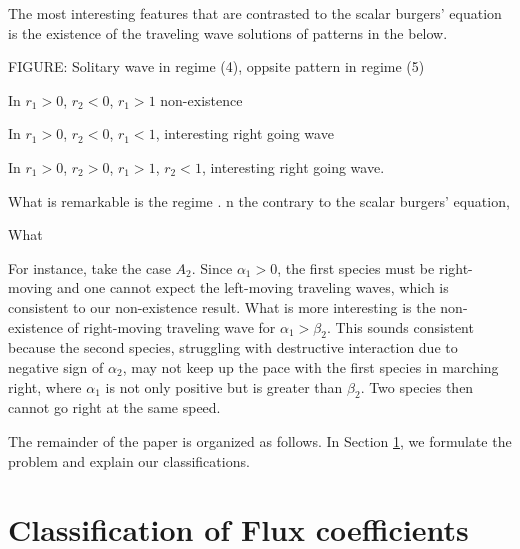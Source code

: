 \documentclass{amsart}
\def\blue{\color{blue}}
\theoremstyle{definition}
\numberwithin{equation}{section}
\begin{document}
{\blue
The most interesting features that are contrasted to the scalar burgers' equation is the existence of the traveling wave solutions of patterns in the below.

FIGURE: Solitary wave in regime (4), oppsite pattern in regime (5)

In $r_1>0$, $r_2<0$, $r_1>1$ non-existence

In $r_1>0$, $r_2<0$, $r_1<1$, interesting right going wave

In $r_1>0$, $r_2>0$, $r_1>1$, $r_2<1$, interesting right going wave.

 What is remarkable is the regime . n the contrary to the scalar burgers' equation, 

What 

% 






For instance, take the case $A_2$. Since $\alpha_1>0$, the first species must be right-moving and one cannot expect the left-moving traveling waves, which is consistent to our non-existence result. What is more interesting is the non-existence of right-moving traveling wave for $\alpha_1>\beta_2$. This sounds consistent because  the second species, struggling with destructive interaction due to negative sign of $\alpha_2$, may not keep up the pace with the first species in marching right, where $\alpha_1$ is not only positive but is greater than $\beta_2$. Two species then cannot go right at the same speed. 

{The remainder of the paper is organized as follows. In Section \ref{notions}, we formulate the problem and explain our classifications.  }
}


\section{Classification of Flux coefficients} \label{notions}
\end{document}
